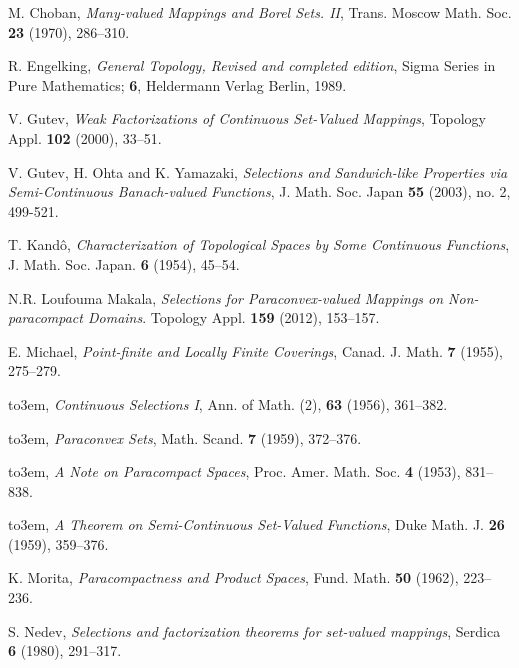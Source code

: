 \documentclass[12pt,a4paper,fleqn,leqno]{amsart}
\theoremstyle{plain}
\theoremstyle{definition}
\numberwithin{equation}{section}
\begin{document}
 
\providecommand{\bysame}{\leavevmode\hbox to3em{\hrulefill}\thinspace}
\providecommand{\MR}{\relax\ifhmode\unskip\space\fi MR }
\providecommand{\MRhref}[2]{  \href{http://www.ams.org/mathscinet-getitem?mr=#1}{#2}
}
\providecommand{\href}[2]{#2}
\begin{thebibliography}{1}

M. Choban, \emph{Many-valued Mappings and Borel Sets. II}, Trans. Moscow Math. Soc. \textbf{23} (1970), 286--310.

R. Engelking, \emph{General Topology, Revised and completed
edition}, Sigma Series in Pure Mathematics; \textbf{6}, Heldermann
Verlag Berlin, 1989.

V. Gutev, \emph{Weak Factorizations of Continuous Set-Valued
Mappings}, Topology Appl. \textbf{102} (2000), 33--51.

V. Gutev, H. Ohta and K. Yamazaki, \emph{Selections and
Sandwich-like Properties via Semi-Continuous Banach-valued
Functions}, J. Math. Soc. Japan \textbf{55} (2003), no. 2, 499-521.

T. Kand\^{o}, \emph{Characterization of Topological Spaces by Some
Continuous Functions}, J. Math. Soc. Japan. \textbf{6} (1954),
45--54.

N.R. Loufouma Makala, \emph{Selections for Paraconvex-valued
Mappings on Non-paracompact Domains}. Topology Appl. \textbf{159} (2012),
153--157.

E. Michael, \emph{Point-finite and Locally Finite Coverings}, Canad.
J. Math. \textbf{7} (1955), 275--279.

\bysame, \emph{Continuous Selections I}, Ann. of Math. (2),
\textbf{63} (1956), 361--382.

\bysame, \emph{Paraconvex Sets}, Math. Scand. \textbf{7} (1959),
372--376.

\bysame, \emph{A Note on Paracompact Spaces},
Proc. Amer. Math. Soc. \textbf{4} (1953), 831--838.

\bysame, \emph{A Theorem on Semi-Continuous Set-Valued Functions},
Duke Math. J. \textbf{26} (1959), 359--376.

K. Morita, \emph{Paracompactness and Product Spaces},
Fund. Math. \textbf{50} (1962), 223--236.

S. Nedev, \emph{Selections and factorization theorems for set-valued
mappings}, Serdica \textbf{6} (1980), 291--317.


\end{thebibliography}
\end{document}
